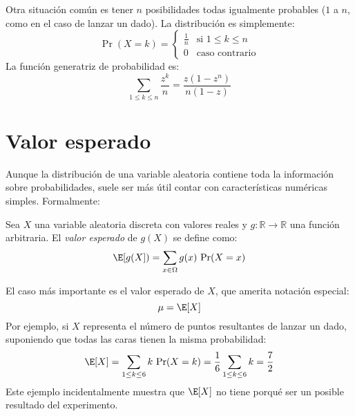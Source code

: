   Otra situación común es tener \(n\) posibilidades
  todas igualmente probables
  (\(1\) a \(n\),
   como en el caso de lanzar un dado).
  La distribución es simplemente:%
  \begin{equation}
    \label{eq:U-distribution}
    \Pr(X = k)
      = \begin{cases}
	  \displaystyle \frac{1}{n} & \text{si \(1 \le k \le n\)} \\
	  0			    & \text{caso contrario}
	\end{cases}
  \end{equation}
  La función generatriz de probabilidad es:
  \begin{equation}
    \label{eq:PGF-U}
    \sum_{1 \le k \le n} \frac{z^k}{n}
      = \frac{z (1 - z^n)}{n (1 - z)}
  \end{equation}

\section{Valor esperado}
\label{sec:valor-esperado}

  Aunque la distribución de una variable aleatoria
  contiene toda la información sobre probabilidades,
  suele ser más útil contar con características numéricas simples.
  Formalmente:
  \begin{definition}
    \label{def:expectation}
    Sea \(X\) una variable aleatoria discreta con valores reales
    y \(g \colon \mathbb{R} \rightarrow \mathbb{R}\)
    una función arbitraria.
    El \emph{valor esperado} de \(g(X)\)
    se define como:
    \begin{equation}
      \label{eq:def:expectation}
      \E[g(X])
	= \sum_{x \in \Omega} g(x) \, \Pr(X = x)
    \end{equation}
  \end{definition}
  El caso más importante es el valor esperado de \(X\),
  que amerita notación especial:
  \begin{equation}
    \label{eq:def:mu}
    \mu
      = \E[X]
  \end{equation}
  Por ejemplo,
  si \(X\)
  representa el número de puntos resultantes de lanzar un dado,
  suponiendo que todas las caras tienen la misma probabilidad:
  \begin{equation*}
    \E[X]
      = \sum_{1 \le k \le 6} k \, \Pr(X = k)
      = \frac{1}{6} \sum_{1 \le k \le 6} k
      = \frac{7}{2}
  \end{equation*}
  Este ejemplo incidentalmente muestra que \(\E[X]\)
  no tiene porqué ser un posible resultado del experimento.

